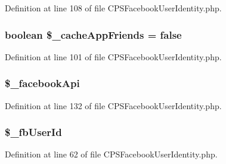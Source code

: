 Definition at line 108 of file CPSFacebookUserIdentity.php.

\hypertarget{classCPSFacebookUserIdentity_a1ef3e76667a47cb12fabf1c9c79f17ff}{
\subsubsection[{\$\_\-cacheAppFriends}]{\setlength{\rightskip}{0pt plus 5cm}boolean \$\_\-cacheAppFriends = false}}
\label{classCPSFacebookUserIdentity_a1ef3e76667a47cb12fabf1c9c79f17ff}


Definition at line 101 of file CPSFacebookUserIdentity.php.

\hypertarget{classCPSFacebookUserIdentity_a2f481ea63815c4c7e8c6dad8b4d839ec}{
\subsubsection[{\$\_\-facebookApi}]{\setlength{\rightskip}{0pt plus 5cm}\$\_\-facebookApi}}
\label{classCPSFacebookUserIdentity_a2f481ea63815c4c7e8c6dad8b4d839ec}


Definition at line 132 of file CPSFacebookUserIdentity.php.

\hypertarget{classCPSFacebookUserIdentity_a19e04e69bd6cde6129a45de979954cfa}{
\subsubsection[{\$\_\-fbUserId}]{\setlength{\rightskip}{0pt plus 5cm}\$\_\-fbUserId}}
\label{classCPSFacebookUserIdentity_a19e04e69bd6cde6129a45de979954cfa}


Definition at line 62 of file CPSFacebookUserIdentity.php.

